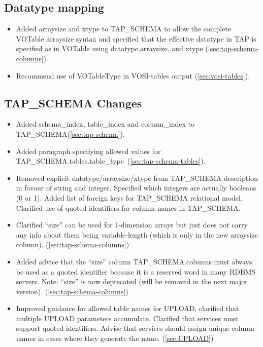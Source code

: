 \documentclass[11pt,letter]{ivoa}
\newcommand{\tapschema}{TAP\_SCHE\-MA}
\newcommand{\tapschema}{\mbox{%
  \relsize{-0.5}TAP\discretionary{-}{}{\kern-2pt\_}SCHEMA}}
\begin{document}
\subsection{Datatype mapping}

\begin{itemize}
\item Added arraysize and xtype to \tapschema{} to allow the complete VOTable arraysize syntax and specified that the effective datatype in TAP is specified as in VOTable using datatype,arraysize, and xtype (\ref{sec:tap-schema-columns}).

\item Recommend use of VOTableType in VOSI-tables output (\ref{sec:vosi-tables}). 
\end{itemize}

\subsection{TAP\_SCHEMA Changes}

\begin{itemize}
\item Added schema\_index, table\_index and column\_index to \tapschema (\ref{sec:tap-schema}).


\item Added paragraph specifying allowed values for \tapschema.tables.table\_type\ (\ref{sec:tap-schema-tables}).

\item Removed explicit datatype/arraysize/xtype from \tapschema{} description
in favour of string and integer. Specified which integers are actually
booleans (0 or 1). Added list of foreign keys for \tapschema{}
relational model. Clarified use of quoted identifiers for column names in 
\tapschema. 

\item Clarified ``size'' can be used for 1-dimension arrays but just does not carry any info about them being variable-length (which is only in the new arraysize column).
(\ref{sec:tap-schema-columns})

\item Added advice that the ``size'' column \tapschema.columns must always be used 
as a quoted identifier because it is a reserved word in many RDBMS 
servers. Note: ``size'' is now deprecated (will be removed in the next major version).
(\ref{sec:tap-schema-columns})

\item Improved guidance for allowed table names for UPLOAD, clarified that 
multiple UPLOAD parameters accumulate. Clarified that services 
must support quoted identifiers. Advise that services should assign unique 
column names in cases where they generate the name.
(\ref{sec:UPLOAD})

\end{itemize}
\end{document}
